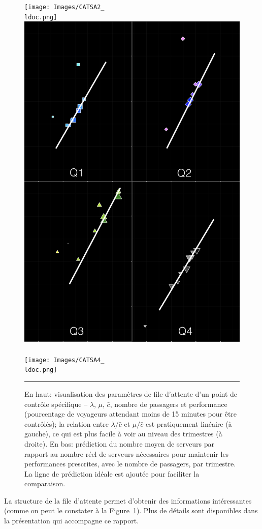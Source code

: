 \begin{figure}[!t]
\centering
\texttt{[image: Images/CATSA2\_\\ldoc.png]}\quad \includegraphics[height=0.35\textheight]{Images/CATSA3.png} \\  \ \\ 
\texttt{[image: Images/CATSA4\_\\ldoc.png]}  
\caption{\small En haut: visualisation des paramètres de file d'attente d'un point de contrôle spécifique -- $\lambda$, $\mu$, $\bar{c}$, nombre de passagers et performance (pourcentage de voyageurs attendant moins de 15 minutes pour être contrôlés); la relation entre $\lambda/\bar{c}$ et $\mu/\bar{c}$ est pratiquement linéaire (à gauche), ce qui est plus facile à voir au niveau des trimestres (à droite). En bas: prédiction du nombre moyen de serveurs par rapport au nombre réel de serveurs nécessaires pour maintenir les performances prescrites, avec le nombre de passagers, par trimestre. La ligne de prédiction idéale est ajoutée pour faciliter la comparaison.}\label{fig:checkpoint}\hrule
\end{figure} 
La structure de la file d'attente permet d'obtenir des informations intéressantes (comme on peut le constater à la  Figure~\ref{fig:checkpoint}). Plus de détails sont disponibles dans la présentation qui accompagne ce rapport.